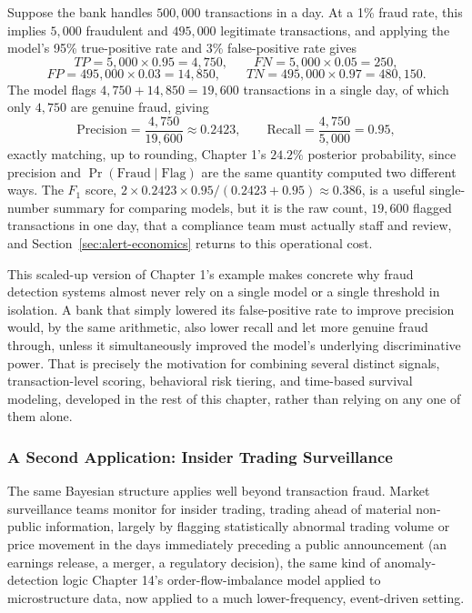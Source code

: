 \documentclass[../ai_in_finance]{subfiles}
\begin{document}
Suppose the bank handles $500{,}000$ transactions in a day. At a 1\% fraud rate, this implies $5{,}000$ fraudulent and $495{,}000$ legitimate transactions, and applying the model's 95\% true-positive rate and 3\% false-positive rate gives
\begin{equation*}
TP = 5{,}000 \times 0.95 = 4{,}750, \qquad FN = 5{,}000 \times 0.05 = 250,
\end{equation*}
\begin{equation*}
FP = 495{,}000 \times 0.03 = 14{,}850, \qquad TN = 495{,}000 \times 0.97 = 480{,}150.
\end{equation*}
The model flags $4{,}750 + 14{,}850 = 19{,}600$ transactions in a single day, of which only $4{,}750$ are genuine fraud, giving
\begin{equation*}
\text{Precision} = \frac{4{,}750}{19{,}600} \approx 0.2423, \qquad \text{Recall} = \frac{4{,}750}{5{,}000} = 0.95,
\end{equation*}
exactly matching, up to rounding, Chapter 1's $24.2\%$ posterior probability, since precision and $\Pr(\text{Fraud}\mid\text{Flag})$ are the same
quantity computed two different ways. The $F_1$ score, $2\times0.2423\times0.95/(0.2423+0.95)\approx0.386$, is a useful single-number summary for
comparing models, but it is the raw count, $19{,}600$ flagged transactions in one day, that a compliance team must actually staff and review, and
Section~\ref{sec:alert-economics} returns to this operational cost.

This scaled-up version of Chapter 1's example makes concrete why fraud detection systems almost never rely on a single model or a single threshold
in isolation. A bank that simply lowered its false-positive rate to improve precision would, by the same arithmetic, also lower recall and let more
genuine fraud through, unless it simultaneously improved the model's underlying discriminative power. That is precisely the motivation for combining several
distinct signals, transaction-level scoring, behavioral risk tiering, and time-based survival modeling, developed in the rest of this chapter, rather
than relying on any one of them alone.

\subsubsection*{A Second Application: Insider Trading Surveillance}

The same Bayesian structure applies well beyond transaction fraud. Market surveillance teams monitor for insider trading, trading ahead of material
non-public information, largely by flagging statistically abnormal trading volume or price movement in the days immediately preceding a public announcement
(an earnings release, a merger, a regulatory decision), the same kind of anomaly-detection logic Chapter 14's order-flow-imbalance model applied to
microstructure data, now applied to a much lower-frequency, event-driven setting.
\end{document}
